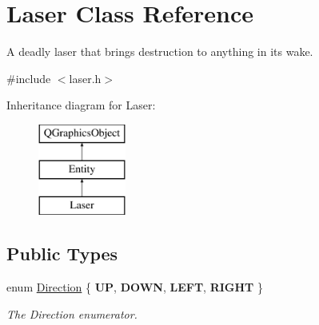 \hypertarget{class_laser}{}\section{Laser Class Reference}
\label{class_laser}


A deadly laser that brings destruction to anything in it\textquotesingle{}s wake.  




{\ttfamily \#include $<$laser.\+h$>$}

Inheritance diagram for Laser\+:\begin{figure}[H]
\begin{center}
\leavevmode
\includegraphics[height=3.000000cm]{class_laser}
\end{center}
\end{figure}
\subsection*{Public Types}
\begin{DoxyCompactItemize}
\item 
\mbox{\label{class_laser_a449bd9d5f3f2c266239c0672a24d122e}} 
enum \hyperlink{class_laser_a449bd9d5f3f2c266239c0672a24d122e}{Direction} \{ {\bfseries UP}, 
{\bfseries D\+O\+WN}, 
{\bfseries L\+E\+FT}, 
{\bfseries R\+I\+G\+HT}
 \}\begin{DoxyCompactList}\small\item\em The Direction enumerator. \end{DoxyCompactList}
\end{DoxyCompactItemize}
